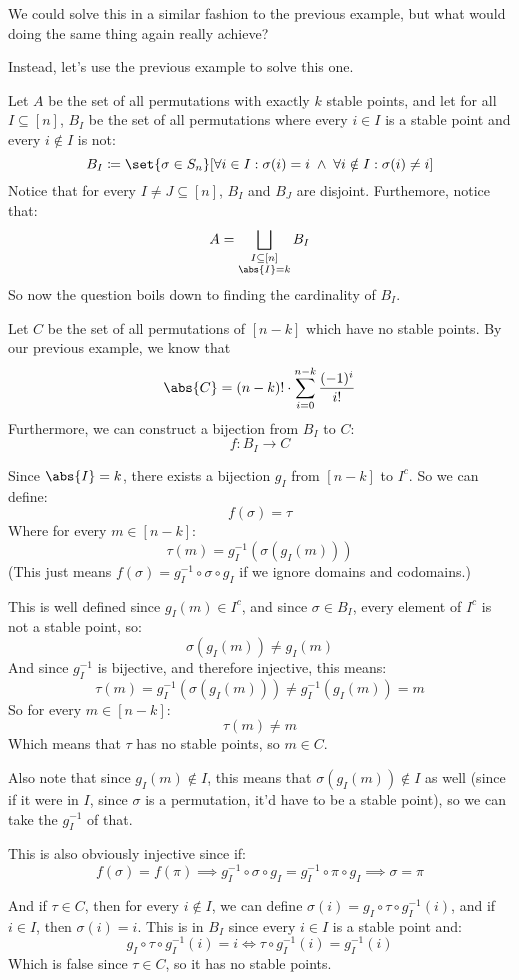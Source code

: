 \begin{blankpp}

	We could solve this in a similar fashion to the previous example, but what would doing the same thing again really
	achieve?

	Instead, let's use the previous example to solve this one.

	Let $A$ be the set of all permutations with exactly $k$ stable points, and let for all $I\subseteq[n]$, $B_I$ be the
	set of all permutations where every $i\in I$ is a stable point and every $i\notin I$ is not:
	\[ B_I\coloneqq\set{\sigma\in S_n}[\forall i\in I: \sigma(i)=i\;\land\; \forall i\notin I: \sigma(i)\neq i] \]
	Notice that for every $I\neq J\subseteq[n]$, $B_I$ and $B_J$ are disjoint.
	Furthemore, notice that:
	\[ A = \bigsqcup_{\substack{I\subseteq[n]\\\abs{I}=k}} B_I \]
	So now the question boils down to finding the cardinality of $B_I$.

	Let $C$ be the set of all permutations of $[n-k]$ which have no stable points.
	By our previous example, we know that 
	\[ \abs{C}=(n-k)!\cdot\sum_{i=0}^{n-k}\frac{(-1)^i}{i!} \]
	Furthermore, we can construct a bijection from $B_I$ to $C$:
	\[ f\colon B_I\longrightarrow C \]

	Since $\abs{I}=k$, there exists a bijection $g_I$ from $[n-k]$ to $I^c$.
	So we can define:
	\[ f(\sigma) = \tau \]
	Where for every $m\in[n-k]$:
	\[ \tau(m) = g_I^{-1}(\sigma(g_I(m))) \]
	(This just means $f(\sigma)=g_I^{-1}\circ\sigma\circ g_I$ if we ignore domains and codomains.)

	This is well defined since $g_I(m)\in I^c$, and since $\sigma\in B_I$, every element of $I^c$ is not a stable point, so:
	\[ \sigma(g_I(m)) \neq g_I(m) \]
	And since $g_I^{-1}$ is bijective, and therefore injective, this means:
	\[ \tau(m) = g_I^{-1}(\sigma(g_I(m))) \neq g_I^{-1}(g_I(m)) = m \]
	So for every $m\in[n-k]$:
	\[ \tau(m)\neq m \]
	Which means that $\tau$ has no stable points, so $m\in C$.

	Also note that since $g_I(m)\notin I$, this means that $\sigma(g_I(m))\notin I$ as well (since if it were in $I$, since
	$\sigma$ is a permutation, it'd have to be a stable point), so we can take the $g_I^{-1}$ of that.

	This is also obviously injective since if:
	\[ f(\sigma) = f(\pi) \implies g_I^{-1}\circ\sigma\circ g_I = g_I^{-1}\circ\pi\circ g_I \implies \sigma=\pi \]

	And if $\tau\in C$, then for every $i\notin I$, we can define $\sigma(i)=g_I\circ\tau\circ g_I^{-1}(i)$,
	and if $i\in I$, then $\sigma(i)=i$.
	This is in $B_I$ since every $i\in I$ is a stable point and:
	\[ g_I\circ\tau\circ g_I^{-1}(i) = i \iff \tau\circ g_I^{-1}(i) = g_I^{-1}(i) \]
	Which is false since $\tau\in C$, so it has no stable points.


\end{blankpp}
